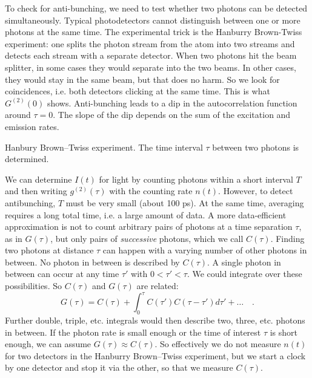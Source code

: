To check for anti-bunching, we need to test whether two photons can be detected simultaneously. Typical photodetectors cannot distinguish between one or more photons at the same time. The experimental trick is the Hanburry Brown-Twiss experiment: one splits the photon stream from the atom into two streams and detects each stream with a separate detector. When two photons hit the beam splitter, in some cases they would separate into the two beams. In other cases, they would stay in the same beam, but that does no harm. So we look for coincidences, i.e. both detectors clicking at the same time. This is what $G^{(2)}(0)$ shows. Anti-bunching leads to a dip in the autocorrelation function around $\tau = 0$. The slope of the dip depends on the sum of the excitation and emission rates. 

\begin{marginfigure}
    \caption{Hanbury Brown--Twiss experiment. The time interval $\tau$ between two photons is determined. \label{fig:8_HBT}}
\end{marginfigure}

We can determine $I(t)$ for light by counting photons within a short interval $T$ and then writing $g^{(2)}(\tau)$ with the counting rate $n(t)$. However, to detect antibunching, $T$ must be very small (about 100 ps). At the same time, averaging requires a long total time, i.e. a large amount of data. 
A more data-efficient approximation is not to count arbitrary pairs of photons at a time separation $\tau$, as in $G(\tau)$, but only pairs of \emph{successive} photons, which we call $C(\tau)$. 
Finding two photons at distance $\tau$ can happen with a varying number of other photons in between. No photon in between is described by $C(\tau)$. A single photon in between can occur at any time $\tau'$ with $0 < \tau' < \tau$. 
We could integrate over these possibilities. So $C(\tau)$ and $G(\tau)$ are related:
\begin{equation}
    G(\tau) = C(\tau) + \int_0^\tau C(\tau') C(\tau-\tau') d\tau' + \dots \quad .
\end{equation}
Further double, triple, etc. integrals would then describe two, three, etc. photons in between. If the photon rate is small enough or the time of interest $\tau$ is short enough, we can assume $G(\tau) \approx C(\tau)$. So effectively we do not measure $n(t)$ for two detectors in the Hanburry Brown--Twiss experiment, but we start a clock by one detector and stop it via the other, so that we measure $C(\tau)$.

